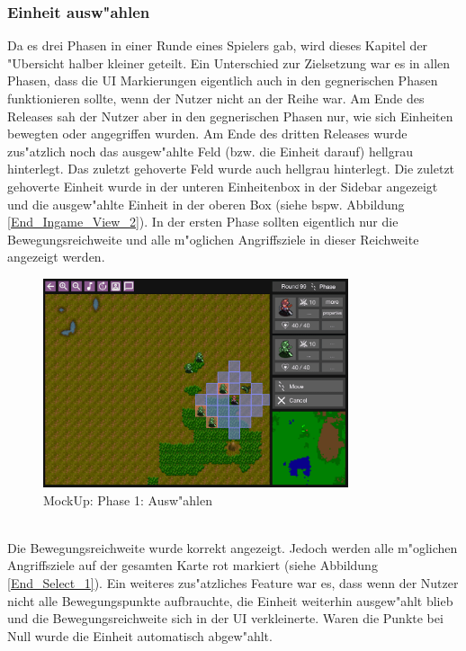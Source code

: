 \documentclass[12pt, titlepage]{scrartcl}
\newcounter{subsubsubsection}[subsubsection]
\begin{document}
			\subsubsection{Einheit ausw"ahlen} \label{END_SELECT}
				Da es drei Phasen in einer Runde eines Spielers gab, wird dieses Kapitel der "Ubersicht halber kleiner geteilt. Ein Unterschied zur Zielsetzung war es in allen Phasen, dass die UI Markierungen eigentlich auch in den gegnerischen Phasen funktionieren sollte, wenn der Nutzer nicht an der Reihe war. Am Ende des Releases sah der Nutzer aber in den gegnerischen Phasen nur, wie sich Einheiten bewegten oder angegriffen wurden. Am Ende des dritten Releases wurde zus"atzlich noch das ausgew"ahlte Feld (bzw. die Einheit darauf) hellgrau hinterlegt. Das zuletzt gehoverte Feld wurde auch hellgrau hinterlegt. Die zuletzt gehoverte Einheit wurde in der unteren Einheitenbox in der Sidebar angezeigt und die ausgew"ahlte Einheit in der oberen Box (siehe bspw. Abbildung \ref{End_Ingame_View_2}).
					In der ersten Phase sollten eigentlich nur die Bewegungsreichweite und alle m"oglichen Angriffsziele in dieser Reichweite angezeigt werden.
					\begin{figure}[H] 
						\centering
						\includegraphics[width=0.8\textwidth]{images/mockUps/Select.png}
						\caption{MockUp: Phase 1: Ausw"ahlen}
						\label{Select_1_2}
					\end{figure}
					\ \\ Die Bewegungsreichweite wurde korrekt angezeigt. Jedoch werden alle m"oglichen Angriffsziele auf der gesamten Karte rot markiert (siehe Abbildung \ref{End_Select_1}). Ein weiteres zus"atzliches Feature war es, dass wenn der Nutzer nicht alle Bewegungspunkte aufbrauchte, die Einheit weiterhin ausgew"ahlt blieb und die Bewegungsreichweite sich in der UI verkleinerte. Waren die Punkte bei Null wurde die Einheit automatisch abgew"ahlt.
\end{document}
